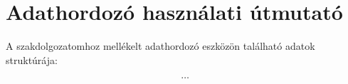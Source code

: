 \chapter*{Adathordozó használati útmutató}



\noindent A szakdolgozatomhoz mellékelt adathordozó eszközön található adatok struktúrája:

$$
\ldots
$$
